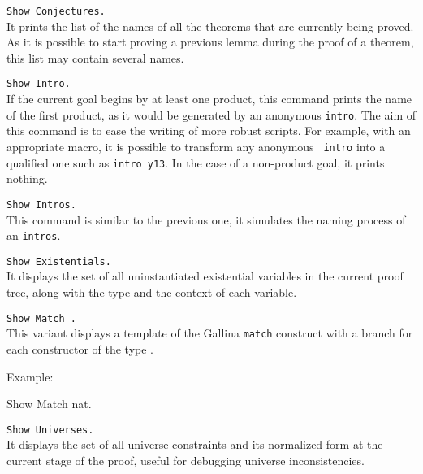 \begin{Variants}
\item {\tt Show Conjectures.}\\
It prints the list of the names of all the theorems that 
are currently being proved.
As it is possible to start proving a previous lemma during
the proof of a theorem, this list may contain several 
names. 

\item{\tt Show Intro.}\\
If the current goal begins by at least one product, this command
prints the name of the first product, as it would be generated by 
an anonymous {\tt intro}. The aim of this command is to ease the
writing of more robust scripts. For example, with an appropriate 
{\ProofGeneral} macro, it is possible to transform any anonymous {\tt
  intro} into a qualified one such as {\tt intro y13}.
In the case of a non-product goal, it prints nothing. 

\item{\tt Show Intros.}\\
This command is similar to the previous one, it simulates the naming 
process of an {\tt intros}.

\item{\tt Show Existentials.\label{ShowExistentials}}
\\ It displays
the set of all uninstantiated existential variables in the current proof tree, 
along with the type and the context of each variable.

\item{\tt Show Match {\ident}.\label{ShowMatch}}\\
This variant displays a template of the Gallina {\tt match} construct 
with a branch for each constructor of the type {\ident}.

Example:

\begin{coq_example}
Show Match nat.  
\end{coq_example}
\begin{ErrMsgs}
\item {}
\end{ErrMsgs}

\item{\tt Show Universes.\label{ShowUniverses}}
\\ It displays the set of all universe constraints and its
normalized form at the current stage of the proof, useful for
debugging universe inconsistencies.

\end{Variants}


